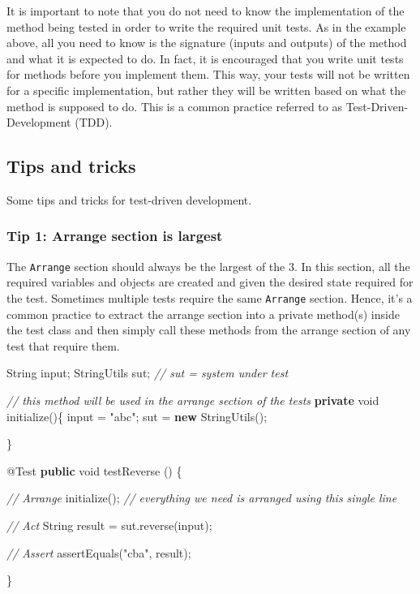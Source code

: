 \documentclass[
]{book}
\newenvironment{Shaded}{\begin{snugshade}}{\end{snugshade}}
\newcommand{\AttributeTok}[1]{\textcolor[rgb]{0.77,0.63,0.00}{#1}}
\newcommand{\BuiltInTok}[1]{#1}
\newcommand{\CommentTok}[1]{\textcolor[rgb]{0.56,0.35,0.01}{\textit{#1}}}
\newcommand{\DataTypeTok}[1]{\textcolor[rgb]{0.13,0.29,0.53}{#1}}
\newcommand{\FunctionTok}[1]{\textcolor[rgb]{0.00,0.00,0.00}{#1}}
\newcommand{\KeywordTok}[1]{\textcolor[rgb]{0.13,0.29,0.53}{\textbf{#1}}}
\newcommand{\NormalTok}[1]{#1}
\newcommand{\StringTok}[1]{\textcolor[rgb]{0.31,0.60,0.02}{#1}}
\begin{document}
It is important to note that you do not need to know the implementation of the method being tested in order to write the required unit tests. As in the example above, all you need to know is the signature (inputs and outputs) of the method and what it is expected to do. In fact, it is encouraged that you write unit tests for methods before you implement them. This way, your tests will not be written for a specific implementation, but rather they will be written based on what the method is supposed to do. This is a common practice referred to as Test-Driven-Development (TDD). \citep{unittesting}

\hypertarget{tricks}{%
\subsection{Tips and tricks}\label{tricks}}

Some tips and tricks for test-driven development.

\hypertarget{tip-1-arrange-section-is-largest}{%
\subsubsection{Tip 1: Arrange section is largest}\label{tip-1-arrange-section-is-largest}}

The \texttt{Arrange} section should always be the largest of the 3. In this section, all the required variables and objects are created and given the desired state required for the test. Sometimes multiple tests require the same \texttt{Arrange} section. Hence, it's a common practice to extract the arrange section into a private method(s) inside the test class and then simply call these methods from the arrange section of any test that require them.

\begin{Shaded}
\begin{Highlighting}[]
\BuiltInTok{String}\NormalTok{ input;}
\NormalTok{StringUtils sut; }\CommentTok{// sut = system under test}

\CommentTok{// this method will be used in the arrange section of the tests}
\KeywordTok{private} \DataTypeTok{void} \FunctionTok{initialize}\NormalTok{()\{}
\NormalTok{    input = }\StringTok{"abc"}\NormalTok{;}
\NormalTok{    sut = }\KeywordTok{new} \FunctionTok{StringUtils}\NormalTok{();}

\NormalTok{\}}

\AttributeTok{@Test}
\KeywordTok{public} \DataTypeTok{void} \FunctionTok{testReverse}\NormalTok{ () \{}

    \CommentTok{// Arrange}
    \FunctionTok{initialize}\NormalTok{(); }\CommentTok{// everything we need is arranged using this single line}

    \CommentTok{// Act}
    \BuiltInTok{String}\NormalTok{ result = sut.}\FunctionTok{reverse}\NormalTok{(input);}

    \CommentTok{// Assert}
    \FunctionTok{assertEquals}\NormalTok{(}\StringTok{"cba"}\NormalTok{, result);}

\NormalTok{\}}
\end{Highlighting}
\end{Shaded}
\end{document}
